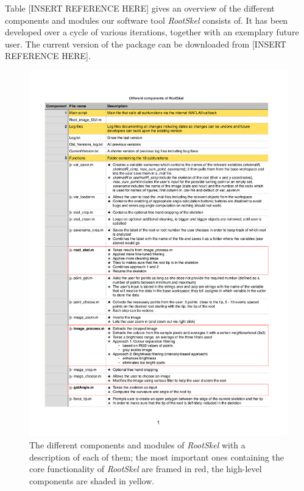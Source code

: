 %


Table [INSERT REFERENCE HERE] gives an overview of the different components and modules our software tool \textit{RootSkel} consists of. It has been developed over a cycle of various iterations, together with an exemplary future user. 
The current version of the package can be downloaded from [INSERT REFERENCE HERE]. %


\begin{figure}[h!]
	\centering
	\includegraphics[width=\textwidth]{../Figures/components.pdf}
	\caption{The different components and modules of \textit{RootSkel} with a description of each of them; the most important ones containing the core functionality of \textit{RootSkel} are framed in red, the high-level components are shaded in yellow.}
	\label{fig:modules}
\end{figure}


